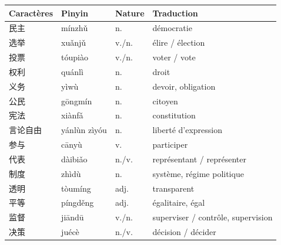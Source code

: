 \documentclass[11pt]{article}
\begin{document}
\begin{definition}
\begin{center}
\begin{tabularx}{\linewidth}{|X|X|X|X|}
\hline
\rowcolor{popblueL} \textbf{Caractères} & \textbf{Pinyin} & \textbf{Nature} & \textbf{Traduction} \\ \hline
民主 & mínzhǔ & n. & démocratie \\ \hline
选举 & xuǎnjǔ & v./n. & élire / élection \\ \hline
投票 & tóupiào & v./n. & voter / vote \\ \hline
权利 & quánlì & n. & droit \\ \hline
义务 & yìwù & n. & devoir, obligation \\ \hline
公民 & gōngmín & n. & citoyen \\ \hline
宪法 & xiànfǎ & n. & constitution \\ \hline
言论自由 & yánlùn zìyóu & n. & liberté d'expression \\ \hline
参与 & cānyù & v. & participer \\ \hline
代表 & dàibiǎo & n./v. & représentant / représenter \\ \hline
制度 & zhìdù & n. & système, régime politique \\ \hline
透明 & tòumíng & adj. & transparent \\ \hline
平等 & píngděng & adj. & égalitaire, égal \\ \hline
监督 & jiāndū & v./n. & superviser / contrôle, supervision \\ \hline
决策 & juécè & n./v. & décision / décider \\ \hline
\end{tabularx}
\end{center}
\end{definition}
\end{document}
